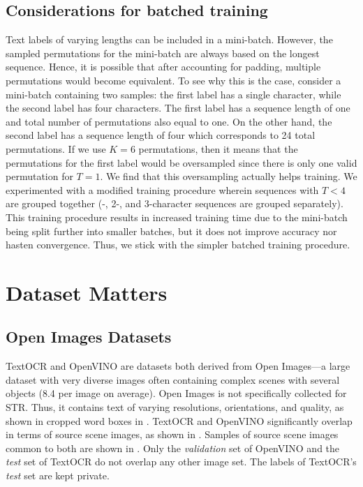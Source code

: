 \subsection{Considerations for batched training}

Text labels of varying lengths can be included in a mini-batch. However, the sampled permutations for the mini-batch are always based on the longest sequence. Hence, it is possible that after accounting for padding, multiple permutations would become equivalent. To see why this is the case, consider a mini-batch containing two samples: the first label has a single character, while the second label has four characters. The first label has a sequence length of one and total number of permutations also equal to one. On the other hand, the second label has a sequence length of four which corresponds to 24 total permutations. If we use $K = 6$ permutations, then it means that the permutations for the first label would be oversampled since there is only one valid permutation for $T = 1$. We find that this oversampling actually helps training. We experimented with a modified training procedure wherein sequences with $T < 4$ are grouped together (-, 2-, and 3-character sequences are grouped separately). This training procedure results in increased training time due to the mini-batch being split further into smaller batches, but it does not improve accuracy nor hasten convergence. Thus, we stick with the simpler batched training procedure.

\section{Dataset Matters}

\subsection{Open Images Datasets}
\label{ch:open-images}

TextOCR and OpenVINO are datasets both derived from Open Images---a large dataset with very diverse images often containing complex scenes with several objects (8.4 per image on average). Open Images is not specifically collected for STR. Thus, it contains text of varying resolutions, orientations, and quality, as shown in cropped word boxes in . TextOCR and OpenVINO significantly overlap in terms of source scene images, as shown in . Samples of source scene images common to both are shown in . Only the 
\textit{validation} set of OpenVINO and the \textit{test} set of TextOCR do not overlap any other image set. The labels of TextOCR's \textit{test} set are kept private.

